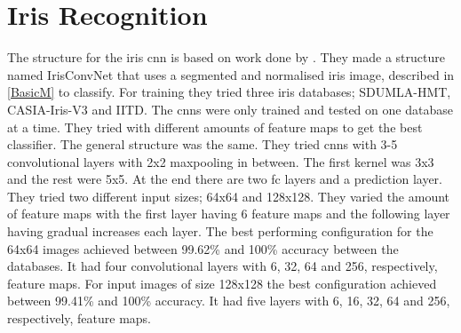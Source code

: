 
\section{Iris Recognition}
The structure for the iris \gls{cnn} is based on work done by \cite{Al-Waisy2017}. They made a structure named IrisConvNet that uses a segmented and normalised iris image, described in \autoref{BasicM} to classify. For training they tried three iris databases; SDUMLA-HMT, CASIA-Iris-V3 and IITD. The \gls{cnn}s were only trained and tested on one database at a time.  They tried with different amounts of feature maps to get the best classifier. The general structure was the same. They tried \gls{cnn}s with 3-5 convolutional layers with 2x2 maxpooling in between. The first kernel was 3x3 and the rest were 5x5. At the end there are two \gls{fc} layers and a prediction layer. They tried two different input sizes; 64x64 and 128x128. They varied the amount of feature maps with the first layer having 6 feature maps and the following layer having gradual increases each layer. The best performing configuration for the 64x64 images achieved between 99.62\% and 100\% accuracy between the databases. It had four convolutional layers with 6, 32, 64 and 256, respectively, feature maps. For input images of size 128x128 the best configuration achieved between 99.41\% and 100\% accuracy. It had five layers with 6, 16, 32, 64 and 256, respectively, feature maps.

